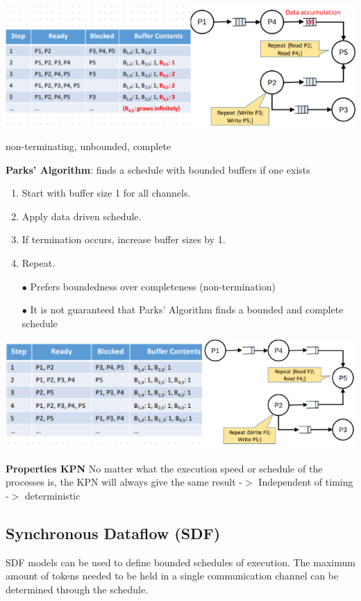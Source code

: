 \documentclass[english]{latex4ei/latex4ei_sheet}
\begin{document}
\begin{center}
  \includegraphics[width=\linewidth]{assets/DDSExample.png}
  \label{fig:ddsexample}
\end{center}
non-terminating, unbounded, complete

\textbf{Parks' Algorithm}: finds a schedule with bounded buffers if one exists
\begin{enumerate}
	\item Start with buffer size 1 for all channels.
	\item Apply data driven schedule.
	\item If termination occurs, increase buffer sizes by 1.
	\item Repeat.
	\item[$\bullet$] Prefers boundedness over completeness (non-termination)
	\item[$\bullet$] It is not guaranteed that Parks’ Algorithm finds a bounded and complete schedule
\end{enumerate}

\begin{center}
  \includegraphics[width=\linewidth]{assets/KPNExamplePark.png}
  \label{fig:kpnexamplepark}
\end{center}

 
\textbf{Properties KPN} No matter what the execution speed or schedule of the processes is, the KPN will always give the same result -$>$ Independent of timing -$>$ deterministic

\subsection{Synchronous Dataflow (SDF)}
SDF models can be used to define bounded schedules of execution. The maximum amount of
tokens needed to be held in a single communication channel can be determined through the
schedule.
\end{document}

